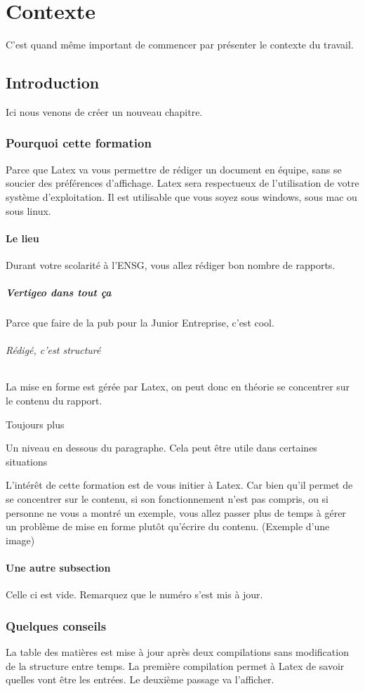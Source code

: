 \part{Contexte}
C'est quand même important de commencer par présenter le contexte du travail.
\chapter{Introduction}
Ici nous venons de créer un nouveau chapitre.
\section{Pourquoi cette formation}
Parce que Latex va vous permettre de rédiger un document en équipe, sans se soucier des préférences d'affichage. Latex sera respectueux de l'utilisation de votre système d'exploitation. Il est utilisable que vous soyez sous windows, sous mac ou sous linux.
\subsection{Le lieu}
Durant votre scolarité à l'ENSG, vous allez rédiger bon nombre de rapports. 
\subsubsection{Vertigeo dans tout ça}
Parce que faire de la pub pour la Junior Entreprise, c'est cool.
\paragraph{Rédigé, c'est structuré}
La mise en forme est gérée par Latex, on peut donc en théorie se concentrer sur le contenu du rapport.
\subparagraph{Toujours plus}
Un niveau en dessous du paragraphe. Cela peut être utile dans certaines situations

L'intérêt de cette formation est de vous initier à Latex. Car bien qu'il permet de se concentrer sur le contenu, si son fonctionnement n'est pas compris, ou si personne ne vous a montré un exemple, vous allez passer plus de temps à gérer un problème de mise en forme plutôt qu'écrire du contenu. (Exemple d'une image)

\subsection{Une autre subsection}
Celle ci est vide. Remarquez que le numéro s'est mis à jour.
\section{Quelques conseils}
La table des matières est mise à jour après deux compilations sans modification de la structure entre temps. La première compilation permet à Latex de savoir quelles vont être les entrées. Le deuxième passage va l'afficher.
